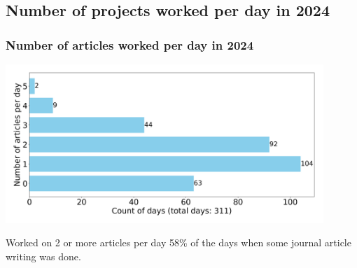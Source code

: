 \documentclass[aspectratio=169]{beamer}
\begin{document}
\subsection{Number of projects worked per day in 2024}
\begin{frame}
\frametitle{Number of articles worked per day in 2024}
\begin{center}
    \includegraphics[width=0.9\textwidth, angle=0]{./Figures/pfMarkedHbar}
\end{center}
Worked on 2 or more articles per day 58\% of the days when some journal article writing was done.
\end{frame}
\note{ }
\end{document}
